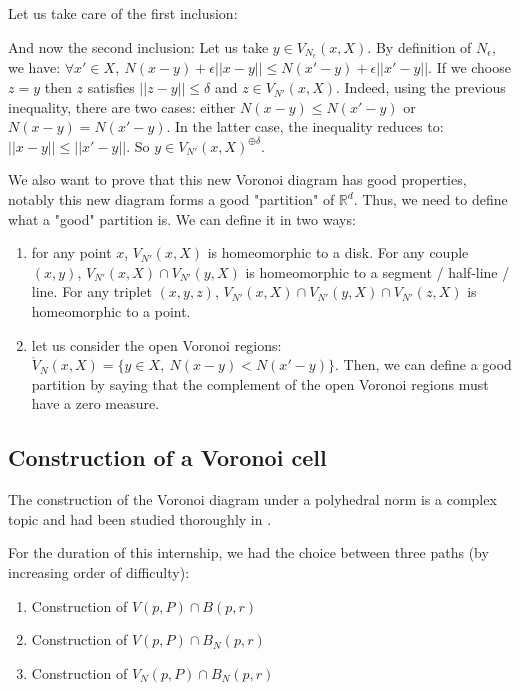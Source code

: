 Let us take care of the first inclusion:

And now the second inclusion:
Let us take $ y \in V_{N_\epsilon}(x, X) $. By definition of $ N_\epsilon $, we
have: $ \forall x' \in X,~N(x - y) + \epsilon || x - y || \leq N(x' - y) +
\epsilon || x' - y || $. If we choose $ z = y $ then $ z $ satisfies $ || z - y
|| \leq \delta $ and $ z \in V_{N'}(x, X) $. Indeed, using the previous
inequality, there are two cases: either $ N(x - y) \leq N(x' - y) $ or $ N(x -
y) = N(x' - y) $. In the latter case, the inequality reduces to: $ || x - y || \leq
|| x' - y || $. So $ y \in V_{N'}(x, X)^{\oplus \delta} $.

We also want to prove that this new Voronoi diagram has good properties, notably
this new diagram forms a good "partition" of $ \mathbb{R}^d $. Thus, we need to
define what a "good" partition is.
We can define it in two ways:
\begin{enumerate}
    \item for any point $ x $, $ V_{N'}(x, X) $ is homeomorphic to a disk. For
        any couple $ (x, y) $, $ V_{N'}(x, X) \cap V_{N'}(y, X) $ is
        homeomorphic to a segment / half-line / line. For any triplet $ (x, y,
        z) $, $ V_{N'}(x, X) \cap V_{N'}(y, X) \cap V_{N'}(z, X) $ is
        homeomorphic to a point.
    \item let us consider the open Voronoi regions: $ \ocirc{V}_N(x, X) = \{ y
        \in X,~ N(x - y) < N(x' - y)\} $. Then, we can define a good partition
        by saying that the complement of the open Voronoi regions must have a
        zero measure.
\end{enumerate}

\subsection{Construction of a Voronoi cell}

The construction of the Voronoi diagram under a polyhedral norm is a complex
topic and had been studied thoroughly in \cite{ma2000bisectors}.

For the duration of this internship, we had the choice between three paths
(by increasing order of difficulty):
\begin{enumerate}
    \item Construction of $ V(p, P) \cap B(p, r) $
    \item Construction of $ V(p, P) \cap B_N(p, r) $
    \item Construction of $ V_N(p, P) \cap B_N(p, r) $
\end{enumerate}

